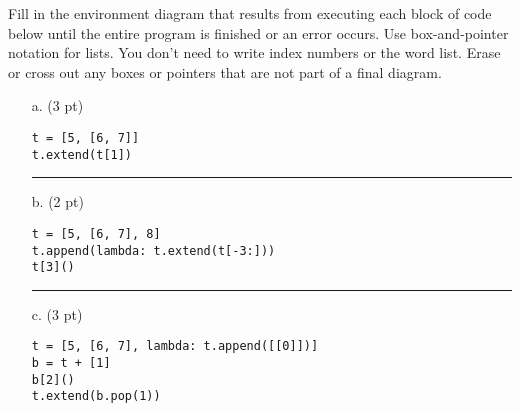 Fill in the environment diagram that results from executing each block of code below until the entire program
is finished or an error occurs.
 Use box-and-pointer notation for lists. You don't need to write index numbers
or the word list. 
Erase or cross out any boxes or pointers that are not part of a final diagram.

\begin{itemize}[leftmargin=0em]
\item[a.] (3 pt)

\begin{minipage}[t]{1.5in}
\noindent
\begin{lstlisting}[frame=single]
t = [5, [6, 7]]
t.extend(t[1])
\end{lstlisting}
\end{minipage}

\vfill
\hrule

\item[b.] (2 pt)

\begin{minipage}[t]{1.5in}
\noindent
\begin{lstlisting}[frame=single]
t = [5, [6, 7], 8]
t.append(lambda: t.extend(t[-3:]))
t[3]()
\end{lstlisting}
\end{minipage}

\vfill
\hrule

\item[c.] (3 pt)

\begin{minipage}[t]{2in}
\noindent
\begin{lstlisting}[frame=single]
t = [5, [6, 7], lambda: t.append([[0]])]
b = t + [1]
b[2]()
t.extend(b.pop(1))
\end{lstlisting}
\end{minipage}


\vfill

\end{itemize}

